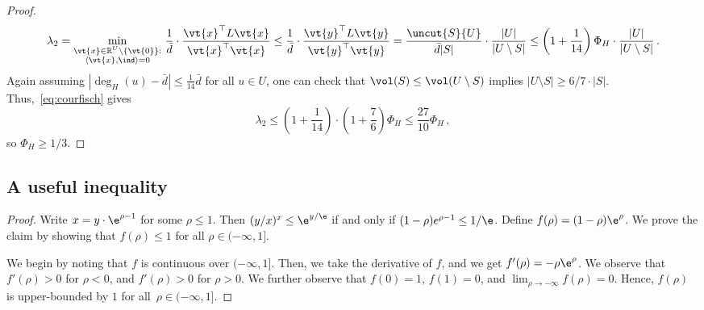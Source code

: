 \begin{proof}
	\begin{align}
		\label{eq:courfisch}
		\lambda_2 = \min_{\substack{\vt{x} \in \mathbb{R}^U\setminus \{\vt{0}\}:\\ \langle \vt{x}, \ind \rangle= 0}} \, \frac{1}{\bar{d}} \cdot \frac{\vt{x}^\top L\vt{x}}{ \vt{x}^\top \vt{x}} \le \frac{1}{\bar{d}} \cdot  \frac{\vt{y}^\top L\vt{y}}{\vt{y}^\top \vt{y}}  = \frac{\uncut{S}{U}}{\bar{d}|S|} \cdot \frac{|U|}{|U\setminus S|}  \le \left(1+\frac{1}{14}\right)\Phi_H \cdot \frac{|U|}{|U\setminus S|} \, .
	\end{align}
	Again assuming $\left|\deg_H(u)-\bar{d}\right|\le \frac{1}{14} \bar{d}$ for all $u \in U$, one can check that $\vol(S) \le \vol(U\setminus S)$ implies $|U\setminus S| \ge 6/7 \cdot |S|$. Thus,~\eqref{eq:courfisch} gives
	\begin{equation*}
		\lambda_2 \le \left(1+\frac{1}{14}\right)\cdot \left(1+\frac{7}{6}\right) \Phi_H \le \frac{27}{10} \Phi_H \, ,
	\end{equation*}
	so $\Phi_H \ge 1/3$.
\end{proof}

\subsection{A useful inequality}
\label{apndx:ineq}
\math*
\begin{proof}
	Write $x=y\cdot \e^{\rho-1}$ for some $\rho \le 1$. Then $(y/x)^x \le \e^{y/\e}$ if and only if $(1-\rho)e^{\rho-1} \le 1/\e$. Define $f(\rho)=(1-\rho)\e^{\rho}$. We prove the claim by showing that $f(\rho) \le 1$ for all $ \rho \in (-\infty, 1]$.
	
	We begin by noting that $f$ is continuous over $(-\infty, 1]$. Then, we take the derivative of $f$, and we get $f'(\rho)=-\rho \e^\rho$. We observe that $f'(\rho) > 0$ for $\rho <0$, and $f'(\rho) > 0$ for $\rho >0$. We further observe that $f(0) = 1$, $f(1)=0$, and $\lim_{\rho \rightarrow -\infty} f(\rho) = 0$. Hence, $f(\rho)$ is upper-bounded by $1$ for all~$\rho \in (-\infty, 1]$.
\end{proof}
